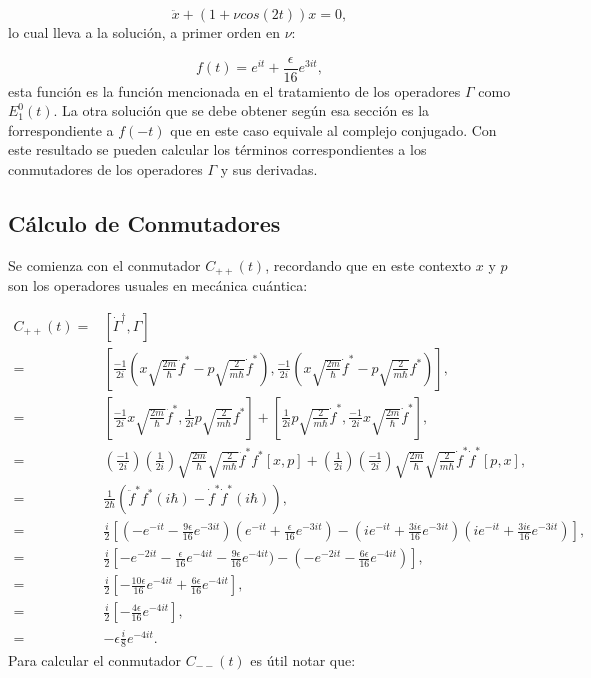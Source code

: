 \documentclass[a4paper,10pt]{report}
\begin{document}
\begin{equation}
\ddot{x} + (1 + \nu cos(2t))x=0,
\end{equation} lo cual lleva a la solución, a primer orden en $\nu$:

\begin{equation}
f(t) = e^{it} + \frac{\epsilon}{16} e^{3it},
\end{equation} esta función es la función mencionada en el tratamiento de los operadores $\Gamma$ como $E_1^0(t)$. La otra solución que se debe obtener según esa sección es la forrespondiente a $f(-t)$ que en este caso equivale al complejo conjugado. Con este resultado se pueden calcular los términos correspondientes a los conmutadores de los operadores $\Gamma$ y sus derivadas.

\subsection{Cálculo de Conmutadores}

Se comienza con el conmutador $C_{++}(t)$, recordando que en este contexto $x$ y $p$ son los operadores usuales en mecánica cuántica:

\begin{align*}
C_{++}(t) =& [\dot{\Gamma}^\dagger,\Gamma]\\
 =&[\frac{-1}{2i}(x\sqrt{\frac{2m}{\hbar}}\ddot{f}^*-p\sqrt{\frac{2}{m\hbar}}\dot{f}^*),\frac{-1}{2i}(x\sqrt{\frac{2m}{\hbar}}\dot{f}^*-p\sqrt{\frac{2}{m\hbar}}f^*)],\\
 =&[\frac{-1}{2i}x\sqrt{\frac{2m}{\hbar}}\ddot{f}^*,\frac{1}{2i}p\sqrt{\frac{2}{m\hbar}}f^*]+[\frac{1}{2i}p\sqrt{\frac{2}{m\hbar}}\dot{f}^*,\frac{-1}{2i}x\sqrt{\frac{2m}{\hbar}}\dot{f}^*],\\
 =&(\frac{-1}{2i})(\frac{1}{2i})\sqrt{\frac{2m}{\hbar}}\sqrt{\frac{2}{m\hbar}}\ddot{f}^*f^*[x,p]+(\frac{1}{2i})(\frac{-1}{2i})\sqrt{\frac{2m}{\hbar}}\sqrt{\frac{2}{m\hbar}}\dot{f}^*\dot{f}^*[p,x],\\
 =&\frac{1}{2\hbar}(\ddot{f}^*f^*(i\hbar)-\dot{f}^*\dot{f}^*(i\hbar)),\\
 =&\frac{i}{2}[(-e^{-it}-\frac{9\epsilon}{16}e^{-3it})(e^{-it}+\frac{\epsilon}{16}e^{-3it})-(ie^{-it}+\frac{3i\epsilon}{16}e^{-3it})(ie^{-it}+\frac{3i\epsilon}{16}e^{-3it})],\\ 
 =&\frac{i}{2}[-e^{-2it}-\frac{\epsilon}{16}e^{-4it}-\frac{9\epsilon}{16}e^{-4it})-(-e^{-2it}-\frac{6\epsilon}{16}e^{-4it})],\\
 =&\frac{i}{2}[-\frac{10\epsilon}{16}e^{-4it}+\frac{6\epsilon}{16}e^{-4it}],\\
 =&\frac{i}{2}[-\frac{4\epsilon}{16}e^{-4it}],\\
 =&-\epsilon\frac{i}{8}e^{-4it}.
\end{align*} Para calcular el conmutador $C_{--}(t)$ es útil notar que:
\end{document}
